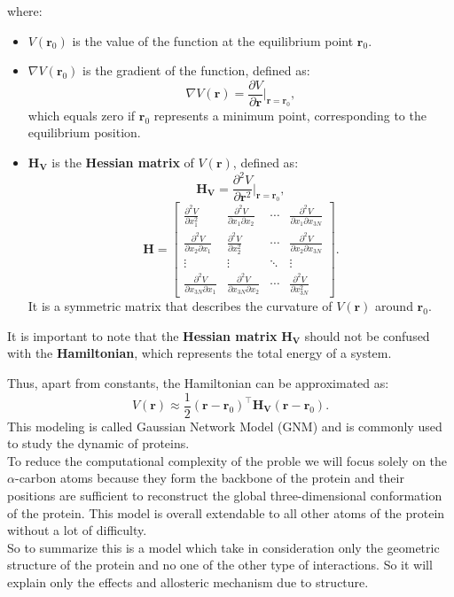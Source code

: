 \documentclass[English, Lau, oneside]{sapthesis}
\begin{document}
where:
\begin{itemize}
    \item \( V(\mathbf{r}_0) \) is the value of the function at the equilibrium point \( \mathbf{r}_0 \).
    \item \( \nabla V(\mathbf{r}_0) \) is the gradient of the function, defined as:
    \begin{equation}
    \nabla V(\mathbf{r}) = \frac{\partial V}{\partial \mathbf{r}} \bigg|_{\mathbf{r} = \mathbf{r}_0},
    \end{equation}
    which equals zero if \( \mathbf{r}_0 \) represents a minimum point, corresponding to the equilibrium position.
    \item \( \mathbf{H_V} \) is the \textbf{Hessian matrix} of \( V(\mathbf{r}) \), defined as:
    \begin{equation}
    \mathbf{H_V} = \frac{\partial^2 V}{\partial \mathbf{r}^2} \bigg|_{\mathbf{r} = \mathbf{r}_0},
    \end{equation}
    \[
    \mathbf{H} = \begin{bmatrix}
    \frac{\partial^2 V}{\partial x_1^2} & \frac{\partial^2 V}{\partial x_1 \partial x_2} & \cdots & \frac{\partial^2 V}{\partial x_1 \partial x_{3N}} \\
    \frac{\partial^2 V}{\partial x_2 \partial x_1} & \frac{\partial^2 V}{\partial x_2^2} & \cdots & \frac{\partial^2 V}{\partial x_2 \partial x_{3N}} \\
    \vdots & \vdots & \ddots & \vdots \\
    \frac{\partial^2 V}{\partial x_{3N} \partial x_1} & \frac{\partial^2 V}{\partial x_{3N} \partial x_2} & \cdots & \frac{\partial^2 V}{\partial x_{3N}^2}
    \end{bmatrix}.
    \]
    It is a symmetric matrix that describes the curvature of \( V(\mathbf{r}) \) around \( \mathbf{r}_0 \).
\end{itemize}

It is important to note that the \textbf{Hessian matrix} \( \mathbf{H_V} \) should not be confused with the \textbf{Hamiltonian}, which represents the total energy of a system.  

Thus, apart from constants, the Hamiltonian can be approximated as:
\begin{equation}
V(\mathbf{r}) \approx \frac{1}{2} (\mathbf{r} - \mathbf{r}_0)^\top \mathbf{H_V} (\mathbf{r} - \mathbf{r}_0). \label{1.1}
\end{equation}
This modeling is called Gaussian Network Model (GNM) and is commonly used to study the dynamic of proteins.\\
To reduce the computational complexity of the proble  we will focus solely on the \(\alpha\)-carbon atoms because they form the backbone of the protein and their positions are sufficient to reconstruct the global three-dimensional conformation of the protein.
This model is overall extendable to all other atoms of the protein without a lot of difficulty.\\
So to summarize this is a model which take in consideration only the geometric structure of the protein and no one of the other type of interactions. So it will explain only the effects and allosteric mechanism due to structure.
\newpage
\end{document}
